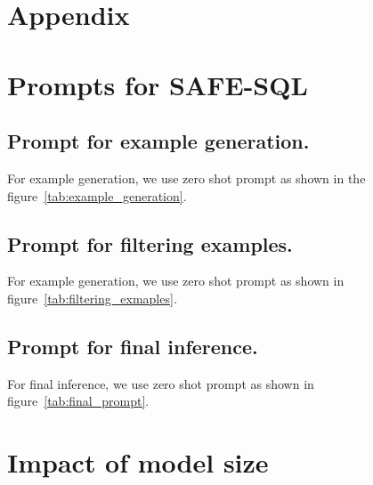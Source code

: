 \appendix
\newpage
\clearpage
\section{Appendix}

% 





%

\section{Prompts for SAFE-SQL}
\subsection{Prompt for example generation.}
\label{appen:example_prompt}
For example generation, we use zero shot prompt as shown in the figure~\ref{tab:example_generation}. 




\subsection{Prompt for filtering examples.}
\label{appen:filtering_examples}
For example generation, we use zero shot prompt as shown in figure~\ref{tab:filtering_exmaples}. 


\subsection{Prompt for final inference.}
\label{appen:final_inference}
For final inference, we use zero shot prompt as shown in figure~\ref{tab:final_prompt}. 

\label{appen:Impact_size}





\section{Impact of model size}


